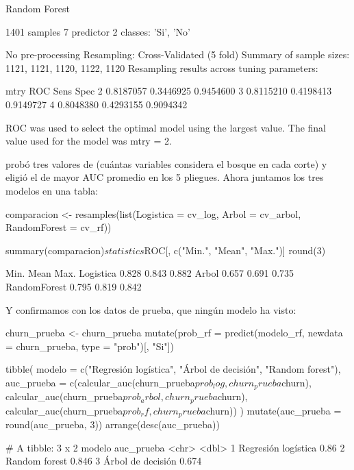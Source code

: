 \begin{rsalida}
Random Forest 

1401 samples
   7 predictor
   2 classes: 'Si', 'No' 

No pre-processing
Resampling: Cross-Validated (5 fold) 
Summary of sample sizes: 1121, 1121, 1120, 1122, 1120 
Resampling results across tuning parameters:

  mtry  ROC        Sens       Spec     
  2     0.8187057  0.3446925  0.9454600
  3     0.8115210  0.4198413  0.9149727
  4     0.8048380  0.4293155  0.9094342

ROC was used to select the optimal model using the largest value.
The final value used for the model was mtry = 2.
\end{rsalida}

 probó tres valores de  (cuántas variables
considera el bosque en cada corte) y eligió el de mayor AUC promedio en los 5
pliegues. Ahora juntamos los tres modelos en una tabla:

\begin{rcode}
comparacion <- resamples(list(Logistica = cv_log, Arbol = cv_arbol,
                              RandomForest = cv_rf))

summary(comparacion)$statistics$ROC[, c("Min.", "Mean", "Max.")] %
  round(3)
\end{rcode}

\begin{rsalida}
              Min.  Mean  Max.
Logistica    0.828 0.843 0.882
Arbol        0.657 0.691 0.735
RandomForest 0.795 0.819 0.842
\end{rsalida}

Y confirmamos con los datos de prueba, que ningún modelo ha visto:

\begin{rcode}
churn_prueba <- churn_prueba %
  mutate(prob_rf = predict(modelo_rf, newdata = churn_prueba,
                           type = "prob")[, "Si"])

tibble(
  modelo = c("Regresión logística", "Árbol de decisión",
             "Random forest"),
  auc_prueba = c(calcular_auc(churn_prueba$prob_log, churn_prueba$churn),
                 calcular_auc(churn_prueba$prob_arbol, churn_prueba$churn),
                 calcular_auc(churn_prueba$prob_rf, churn_prueba$churn))
) %
  mutate(auc_prueba = round(auc_prueba, 3)) %
  arrange(desc(auc_prueba))
\end{rcode}

\begin{rsalida}
# A tibble: 3 x 2
  modelo              auc_prueba
  <chr>                    <dbl>
1 Regresión logística      0.86 
2 Random forest            0.846
3 Árbol de decisión        0.674
\end{rsalida}

